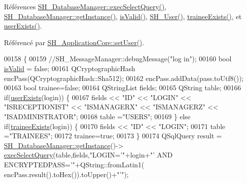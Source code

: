 Références \hyperlink{classSH__DatabaseManager_ab8f9850cb68444ab9a4e613b36a3b044}{S\-H\-\_\-\-Database\-Manager\-::exec\-Select\-Query()}, \hyperlink{classSH__DatabaseManager_a31198eb4de0f8b18e3fa0eed09f24d19}{S\-H\-\_\-\-Database\-Manager\-::get\-Instance()}, \hyperlink{classSH__User_a07de5c02b2a02b3bb2b0aaf0886bb4d9}{is\-Valid()}, \hyperlink{classSH__User_a96c0ebb3f11c1654935aaecb92295724}{S\-H\-\_\-\-User()}, \hyperlink{classSH__User_adfc35c967cb405f4a14886676612fbb7}{trainee\-Exists()}, et \hyperlink{classSH__User_a64161b35866b1c635d5f4214095a2b1e}{user\-Exists()}.



Référencé par \hyperlink{classSH__ApplicationCore_a2dd5c029a2ea348f1dfd0a60dea476e4}{S\-H\-\_\-\-Application\-Core\-::set\-User()}.


\begin{DoxyCode}
00158 \{
00159     \textcolor{comment}{//SH\_MessageManager::debugMessage("log in");}
00160     \textcolor{keywordtype}{bool} \hyperlink{classSH__User_a07de5c02b2a02b3bb2b0aaf0886bb4d9}{isValid} = \textcolor{keyword}{false};
00161     QCryptographicHash encPass(QCryptographicHash::Sha512);
00162     encPass.addData(pass.toUtf8());
00163     \textcolor{keywordtype}{bool} trainee=\textcolor{keyword}{false};
00164     QStringList fields;
00165     QString table;
00166     \textcolor{keywordflow}{if}(\hyperlink{classSH__User_a64161b35866b1c635d5f4214095a2b1e}{userExists}(login)) \{
00167         fields << \textcolor{stringliteral}{"ID"} << \textcolor{stringliteral}{"LOGIN"} << \textcolor{stringliteral}{"ISRECEPTIONIST"} << \textcolor{stringliteral}{"ISMANAGERX"} << \textcolor{stringliteral}{"ISMANAGERZ"} << \textcolor{stringliteral}{"ISADMINISTRATOR"};
00168         table =\textcolor{stringliteral}{"USERS"};
00169     \} \textcolor{keywordflow}{else} \textcolor{keywordflow}{if}(\hyperlink{classSH__User_adfc35c967cb405f4a14886676612fbb7}{traineeExists}(login)) \{
00170         fields << \textcolor{stringliteral}{"ID"} << \textcolor{stringliteral}{"LOGIN"};
00171         table =\textcolor{stringliteral}{"TRAINEES"};
00172         trainee=\textcolor{keyword}{true};
00173     \}
00174     QSqlQuery result = \hyperlink{classSH__DatabaseManager_a31198eb4de0f8b18e3fa0eed09f24d19}{SH\_DatabaseManager::getInstance}()->
      \hyperlink{classSH__DatabaseManager_ab8f9850cb68444ab9a4e613b36a3b044}{execSelectQuery}(table,fields,\textcolor{stringliteral}{"LOGIN='"}+login+\textcolor{stringliteral}{"' AND ENCRYPTEDPASS='"}+QString::fromLatin1(
      encPass.result().toHex()).toUpper()+\textcolor{stringliteral}{"'"});

\end{DoxyCode}
